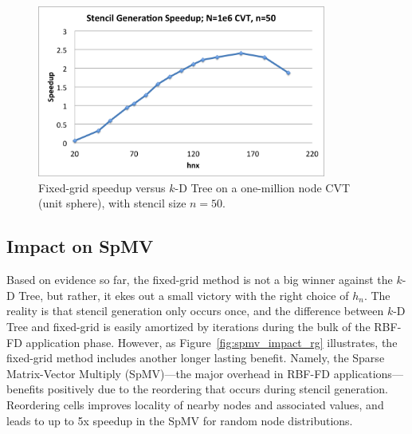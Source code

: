 \documentclass{report}
\begin{document}


\begin{figure}
\centering
\includegraphics[width=9.5cm]{../figures/stencils/cvt1m_stencil_gen_speedup.png}
\caption{Fixed-grid speedup versus $k$-D Tree on a one-million node CVT (unit sphere), with stencil size $n=50$.}
\label{fig:cvt_hn_speedup}
\end{figure}

\subsection{Impact on SpMV}

Based on evidence so far, the fixed-grid method is not a big winner against the $k$-D Tree, but rather, it ekes out a small victory with the right choice of $h_n$. The reality is that stencil generation only occurs once, and the difference between $k$-D Tree and fixed-grid is easily amortized by iterations during the bulk of the RBF-FD application phase. However, as Figure~\ref{fig:spmv_impact_rg} illustrates, the fixed-grid method includes another longer lasting benefit. Namely, the Sparse Matrix-Vector Multiply (SpMV)---the major overhead in RBF-FD applications---benefits positively due to the reordering that occurs during stencil generation. Reordering cells improves locality of nearby nodes and associated values, and leads to up to 5x speedup in the SpMV for random node distributions. 
\end{document}
